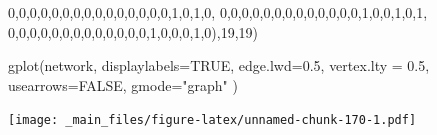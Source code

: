 \documentclass[
  notitlepage,
  onecolumn,
  openany]{book}
\newenvironment{Shaded}{\begin{snugshade}}{\end{snugshade}}
\newcommand{\AttributeTok}[1]{\textcolor[rgb]{0.77,0.63,0.00}{#1}}
\newcommand{\ConstantTok}[1]{\textcolor[rgb]{0.00,0.00,0.00}{#1}}
\newcommand{\DecValTok}[1]{\textcolor[rgb]{0.00,0.00,0.81}{#1}}
\newcommand{\FloatTok}[1]{\textcolor[rgb]{0.00,0.00,0.81}{#1}}
\newcommand{\FunctionTok}[1]{\textcolor[rgb]{0.00,0.00,0.00}{#1}}
\newcommand{\NormalTok}[1]{#1}
\newcommand{\SpecialCharTok}[1]{\textcolor[rgb]{0.00,0.00,0.00}{#1}}
\newcommand{\StringTok}[1]{\textcolor[rgb]{0.31,0.60,0.02}{#1}}
\begin{document}
\begin{Shaded}
\begin{Highlighting}[]
  \DecValTok{0}\NormalTok{,}\DecValTok{0}\NormalTok{,}\DecValTok{0}\NormalTok{,}\DecValTok{0}\NormalTok{,}\DecValTok{0}\NormalTok{,}\DecValTok{0}\NormalTok{,}\DecValTok{0}\NormalTok{,}\DecValTok{0}\NormalTok{,}\DecValTok{0}\NormalTok{,}\DecValTok{0}\NormalTok{,}\DecValTok{0}\NormalTok{,}\DecValTok{0}\NormalTok{,}\DecValTok{0}\NormalTok{,}\DecValTok{0}\NormalTok{,}\DecValTok{0}\NormalTok{,}\DecValTok{1}\NormalTok{,}\DecValTok{0}\NormalTok{,}\DecValTok{1}\NormalTok{,}\DecValTok{0}\NormalTok{,}
  \DecValTok{0}\NormalTok{,}\DecValTok{0}\NormalTok{,}\DecValTok{0}\NormalTok{,}\DecValTok{0}\NormalTok{,}\DecValTok{0}\NormalTok{,}\DecValTok{0}\NormalTok{,}\DecValTok{0}\NormalTok{,}\DecValTok{0}\NormalTok{,}\DecValTok{0}\NormalTok{,}\DecValTok{0}\NormalTok{,}\DecValTok{0}\NormalTok{,}\DecValTok{0}\NormalTok{,}\DecValTok{0}\NormalTok{,}\DecValTok{1}\NormalTok{,}\DecValTok{0}\NormalTok{,}\DecValTok{0}\NormalTok{,}\DecValTok{1}\NormalTok{,}\DecValTok{0}\NormalTok{,}\DecValTok{1}\NormalTok{,}
  \DecValTok{0}\NormalTok{,}\DecValTok{0}\NormalTok{,}\DecValTok{0}\NormalTok{,}\DecValTok{0}\NormalTok{,}\DecValTok{0}\NormalTok{,}\DecValTok{0}\NormalTok{,}\DecValTok{0}\NormalTok{,}\DecValTok{0}\NormalTok{,}\DecValTok{0}\NormalTok{,}\DecValTok{0}\NormalTok{,}\DecValTok{0}\NormalTok{,}\DecValTok{0}\NormalTok{,}\DecValTok{0}\NormalTok{,}\DecValTok{1}\NormalTok{,}\DecValTok{0}\NormalTok{,}\DecValTok{0}\NormalTok{,}\DecValTok{0}\NormalTok{,}\DecValTok{1}\NormalTok{,}\DecValTok{0}\NormalTok{),}\DecValTok{19}\NormalTok{,}\DecValTok{19}\NormalTok{)}

\FunctionTok{gplot}\NormalTok{(network,}
      \AttributeTok{displaylabels=}\ConstantTok{TRUE}\NormalTok{,}
      \AttributeTok{edge.lwd=}\FloatTok{0.5}\NormalTok{,}
      \AttributeTok{vertex.lty =} \FloatTok{0.5}\NormalTok{,}
      \AttributeTok{usearrows=}\ConstantTok{FALSE}\NormalTok{, }
      \AttributeTok{gmode=}\StringTok{"graph"}
\NormalTok{)}
\end{Highlighting}
\end{Shaded}

\texttt{[image: \_main\_files/figure-latex/unnamed-chunk-170-1.pdf]}

\begin{Shaded}
\end{Shaded}
\end{document}
